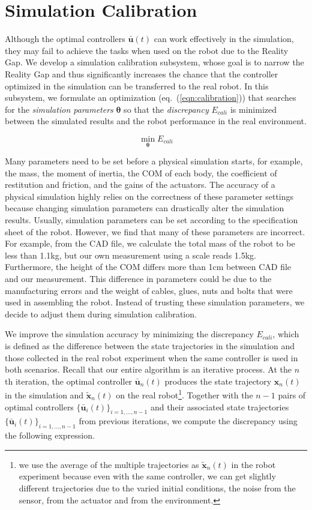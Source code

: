 \section{Simulation Calibration}

Although the optimal controllers $\bar{\mathbf{u}}(t)$ can work effectively in the simulation, they may fail to achieve the tasks when used on the robot due to the Reality Gap. We develop a simulation calibration subsystem, whose goal is to narrow the Reality Gap and thus significantly increases the chance that the controller optimized in the simulation can be transferred to the real robot. In this subsystem, we formulate an optimization (eq.~(\ref{eqn:calibration})) that searches for the \emph{simulation parameters} $\mathbf{\theta}$ so that the \emph{discrepancy} $E_{cali}$ is minimized between the simulated results and the robot performance in the real environment.

\begin{equation}
 \min_{\mathbf{\theta}} E_{cali}
\label{eqn:calibration}
\end{equation}

Many parameters need to be set before a physical simulation starts, for example, the mass, the moment of inertia, the COM of each body, the coefficient of restitution and friction, and the gains of the actuators. The accuracy of a physical simulation highly relies on the correctness of these parameter settings because changing simulation parameters can drastically alter the simulation results. Usually, simulation parameters can be set according to the specification sheet of the robot. However, we find that many of these parameters are incorrect. For example, from the CAD file, we calculate the total mass of the robot to be less than 1.1kg, but our own measurement using a scale reads 1.5kg. Furthermore, the height of the COM differs more than 1cm between CAD file and our measurement. This difference in parameters could be due to the manufacturing errors and the weight of cables, glues, nuts and bolts that were used in assembling the robot. Instead of trusting these simulation parameters, we decide to adjust them during simulation calibration.

We improve the simulation accuracy by minimizing the discrepancy $E_{cali}$, which is defined as the difference between the state trajectories in the simulation and those collected in the real robot experiment when the same controller is used in both scenarios. Recall that our entire algorithm is an iterative process. At the $n$th iteration, the optimal controller $\bar{\mathbf{u}}_n(t)$ produces the state trajectory $\mathbf{x}_n(t)$ in the simulation and $\tilde{\mathbf{x}}_n(t)$ on the real robot\footnote{we use the average of the multiple trajectories as $\tilde{\mathbf{x}}_n(t)$ in the robot experiment because even with the same controller, we can get slightly different trajectories due to the varied initial conditions, the noise from the sensor, from the actuator and from the environment.}. Together with the $n-1$ pairs of optimal controllers $\{\bar{\mathbf{u}}_i(t)\}_{i=1,...,n-1}$ and their associated state trajectories $\{\bar{\mathbf{u}}_i(t)\}_{i=1,...,n-1}$ from previous iterations, we compute the discrepancy using the following expression. 

